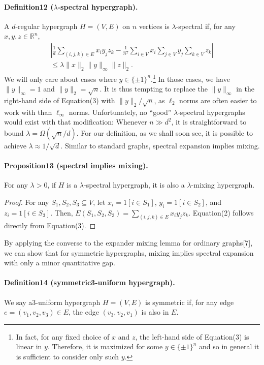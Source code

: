 \documentclass[10pt,a4paper]{article}
\begin{document}
\paragraph{Definition12 ($\lambda$-spectral hypergraph).} A $d$-regular hypergraph $H=(V,E)$ on $n$ vertices is $\lambda$-spectral if, for any $x,y,z\in\mathbb R^n$,
\begin{multline*}
\left|\frac1d\sum_{(i,j,k)\in E}x_iy_jz_k-\frac1{n^2}\sum_{i\in V}x_i\sum_{j\in V}y_j\sum_{k\in V}z_k\right|\\
\leq\lambda\|x\|_2\|y\|_{\infty}\|z\|_2.\tag{3}
\end{multline*}
We will only care about cases where $y\in\{\pm1\}^n$.\footnote{In fact, for any fixed choice of $x$ and $z$, the left-hand side of Equation(3) is linear in $y$. Therefore, it is maximized for some $y\in\{\pm1\}^n$ and so in general it is sufficient to consider only such $y$.} In those cases, we have $\|y\|_{\infty}=1$ and $\|y\|_2=\sqrt n$. It is thus tempting to replace the $\|y\|_{\infty}$ in the right-hand side of Equation(3) with $\|y\|_2/\sqrt n$, as $\ell_2$ norms are often easier to work with than $\ell_{\infty}$ norms. Unfortunately, no ``good'' $\lambda$-spectral hypergraphs would exist with that modification: Whenever $n\gg d^2$, it is straightforward to bound $\lambda=\Omega(\sqrt n/d)$. For our definition, as we shall soon see, it is possible to achieve $\lambda\approx1/\sqrt d$.
Similar to standard graphs, spectral expansion implies mixing.
\paragraph{Proposition13 (spectral implies mixing).} For any $\lambda>0$, if $H$ is a $\lambda$-spectral hypergraph, it is also a $\lambda$-mixing hypergraph.
\begin{proof}
For any $S_1,S_2,S_3\subseteq V$, let $x_i=1[i\in S_1]$, $y_i=1[i\in S_2]$, and $z_i=1[i\in S_3]$. Then, $E(S_1,S_2,S_3)=\sum_{(i,j,k)\in E}x_iy_jz_k$. Equation(2) follows directly from Equation(3).
\end{proof}
By applying the converse to the expander mixing lemma for ordinary graphs[7], we can show that for symmetric hypergraphs, mixing implies spectral expansion with only a minor quantitative gap.
\paragraph{Definition14 (symmetric3-uniform hypergraph).} We say a3-uniform hypergraph $H=(V,E)$ is symmetric if, for any edge $e=(v_1,v_2,v_3)\in E$, the edge $(v_3,v_2,v_1)$ is also in $E$.
\end{document}

